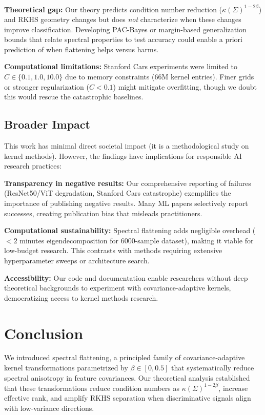 \documentclass[11pt]{article}
\begin{document}
\textbf{Theoretical gap:} Our theory predicts condition number reduction ($\kappa(\Sigma)^{1-2\beta}$) and RKHS geometry changes but does \emph{not} characterize when these changes improve classification. Developing PAC-Bayes or margin-based generalization bounds that relate spectral properties to test accuracy could enable a priori prediction of when flattening helps versus harms.

\textbf{Computational limitations:} Stanford Cars experiments were limited to $C \in \{0.1, 1.0, 10.0\}$ due to memory constraints (66M kernel entries). Finer grids or stronger regularization ($C < 0.1$) might mitigate overfitting, though we doubt this would rescue the catastrophic baselines.

\subsection{Broader Impact}

This work has minimal direct societal impact (it is a methodological study on kernel methods). However, the findings have implications for responsible AI research practices:

\textbf{Transparency in negative results:} Our comprehensive reporting of failures (ResNet50/ViT degradation, Stanford Cars catastrophe) exemplifies the importance of publishing negative results. Many ML papers selectively report successes, creating publication bias that misleads practitioners.

\textbf{Computational sustainability:} Spectral flattening adds negligible overhead ($< 2$ minutes eigendecomposition for 6000-sample dataset), making it viable for low-budget research. This contrasts with methods requiring extensive hyperparameter sweeps or architecture search.

\textbf{Accessibility:} Our code and documentation enable researchers without deep theoretical backgrounds to experiment with covariance-adaptive kernels, democratizing access to kernel methods research.

\section{Conclusion}

We introduced spectral flattening, a principled family of covariance-adaptive kernel transformations parametrized by $\beta \in [0, 0.5]$ that systematically reduce spectral anisotropy in feature covariances. Our theoretical analysis established that these transformations reduce condition numbers as $\kappa(\Sigma)^{1-2\beta}$, increase effective rank, and amplify RKHS separation when discriminative signals align with low-variance directions.
\end{document}
